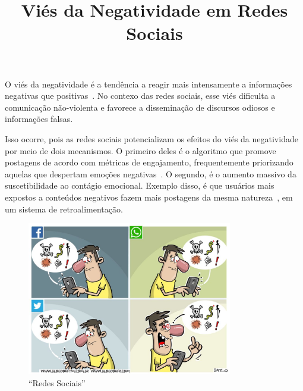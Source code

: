 \documentclass[
    report,
    11pt,
    oneside,
    a4paper,
    english,
    brazil,
    sumario=tradicional
    ]{abntex2}
\title{Viés da Negatividade em Redes Sociais}
\begin{document}

\frenchspacing

\maketitle


\textual

    O viés da negatividade é a tendência a reagir mais intensamente a informações negativas que positivas~\cite{bad-stronger-than-good}. No contexo das redes sociais, esse viés dificulta a comunicação não-violenta e favorece a disseminação de discursos odiosos e informações falsas.

    Isso ocorre, pois as redes sociais potencializam os efeitos do viés da negatividade por meio de dois mecanismos. O primeiro deles é o algoritmo que promove postagens de acordo com métricas de engajamento, frequentemente priorizando aquelas que despertam emoções negativas~\cite{negativity-spreads-wide, negativity-virality}. O segundo, é o aumento massivo da suscetibilidade ao contágio emocional. Exemplo disso, é que usuários mais expostos a conteúdos negativos fazem mais postagens da mesma natureza~\cite{massive-emotional-contagion}, em um sistema de retroalimentação.

\begin{figure}[htb]
    \caption{\label{charge}``Redes Sociais''}
    \centering
    \includegraphics[width=0.8\textwidth]{charge.jpg}
\end{figure}
\end{document}
